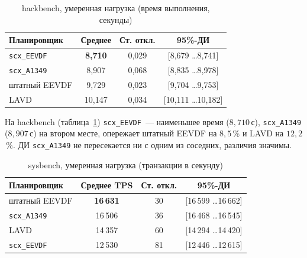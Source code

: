 \documentclass[14pt, oneside]{extbook}
\begin{document}
        \begin{table}[H]
                \centering
                \caption{hackbench, умеренная нагрузка (время выполнения, секунды)}
                \label{tab:moderate_hackbench}
                \vspace{0.4em}
                \begin{tabular}{|l|c|c|c|}
                        \hline
                        Планировщик & Среднее & Ст. откл. & 95\%-ДИ \\
                        \hline
                        \texttt{scx\_EEVDF} & \textbf{8{,}710} & 0{,}029 & [8{,}679 \dots 8{,}741] \\
                        \texttt{scx\_A1349} & 8{,}907 & 0{,}068 & [8{,}835 \dots 8{,}978] \\
                        штатный EEVDF & 9{,}729 & 0{,}023 & [9{,}704 \dots 9{,}753] \\
                        LAVD & 10{,}147 & 0{,}034 & [10{,}111 \dots 10{,}182] \\
                        \hline
                \end{tabular}
        \end{table}

        На hackbench (таблица~\ref{tab:moderate_hackbench})
        \texttt{scx\_EEVDF}~--- наименьшее время
        ($8{,}710$\,с), \texttt{scx\_A1349} ($8{,}907$\,с) на
        втором месте, опережает штатный EEVDF на $8{,}5$\,\%
        и LAVD на $12{,}2$\,\%. ДИ \texttt{scx\_A1349} не
        пересекается ни с одним из соседних, различия значимы.

        \begin{table}[H]
                \centering
                \caption{sysbench, умеренная нагрузка (транзакции в секунду)}
                \label{tab:moderate_sysbench}
                \vspace{0.4em}
                \begin{tabular}{|l|c|c|c|}
                        \hline
                        Планировщик & Среднее TPS & Ст. откл. & 95\%-ДИ \\
                        \hline
                        штатный EEVDF & \textbf{16\,631} & 30 & [16\,599 \dots 16\,662] \\
                        \texttt{scx\_A1349} & 16\,506 & 36 & [16\,468 \dots 16\,545] \\
                        LAVD & 14\,357 & 60 & [14\,294 \dots 14\,420] \\
                        \texttt{scx\_EEVDF} & 12\,530 & 81 & [12\,446 \dots 12\,615] \\
                        \hline
                \end{tabular}
        \end{table}
\end{document}

